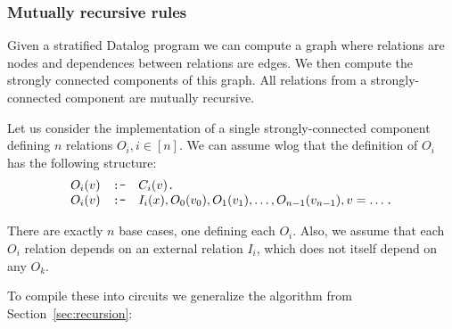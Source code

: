 \subsubsection{Mutually recursive rules}\label{sec:mutually-recursive}

Given a stratified Datalog program we can compute a graph where relations are nodes and dependences
between relations are edges.  We then compute the strongly connected components of this graph.
All relations from a strongly-connected component are mutually recursive.

Let us consider the implementation of a single strongly-connected component defining $n$
relations $O_i, i \in [n]$.  We can assume wlog that the definition of $O_i$ has the following
structure:
\newcommand{\tns}{\code{:-}}
\newcommand{\cd}{\code{.}}
$$
\begin{array}{lll}
O_i(v) &\tns& C_i(v)\cd \\
O_i(v) &\tns&  I_i(x), O_0(v_0), O_1(v_1), \ldots, O_{n-1}(v_{n-1}), v = \ldots \cd \\
\end{array}
$$

There are exactly $n$ base cases, one defining each $O_i$.  Also, we assume that each $O_i$ relation
depends on an external relation $I_i$, which does not itself depend on any $O_k$.

To compile these into circuits we generalize the algorithm from Section~\ref{sec:recursion}:

